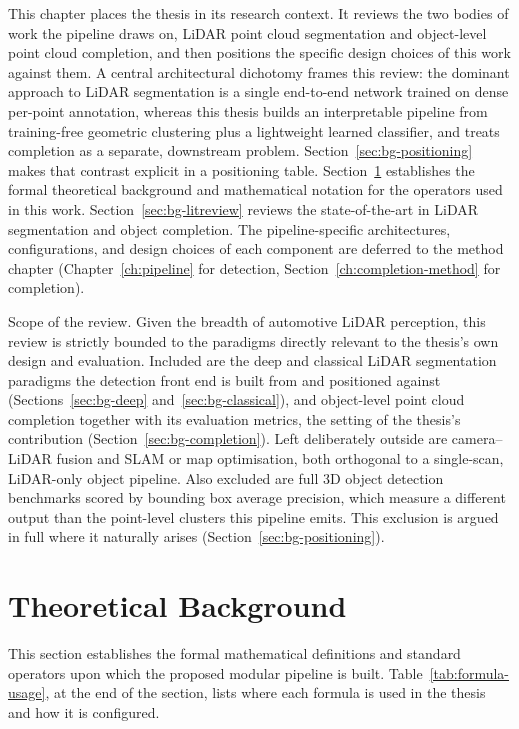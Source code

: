 This chapter places the thesis in its research context. It reviews the two bodies of
work the pipeline draws on, LiDAR point cloud segmentation and object-level
point cloud completion, and then positions the specific design choices of this
work against them. A central architectural dichotomy frames this review: the dominant approach to
LiDAR segmentation is a single end-to-end network trained on dense per-point
annotation, whereas this thesis builds an interpretable pipeline from training-free
geometric clustering plus a lightweight learned classifier, and treats completion as a
separate, downstream problem. Section~\ref{sec:bg-positioning} makes that contrast
explicit in a positioning table. Section~\ref{sec:bg-theory} establishes the formal
theoretical background and mathematical notation for the operators used in this work.
Section~\ref{sec:bg-litreview} reviews the state-of-the-art in LiDAR segmentation and
object completion. The
pipeline-specific architectures, configurations, and design choices of each component are
deferred to the method chapter (Chapter~\ref{ch:pipeline} for detection,
Section~\ref{ch:completion-method} for completion).

Scope of the review. Given the breadth of automotive LiDAR perception, this review
is strictly bounded to the paradigms directly relevant to the thesis's own
design and evaluation. Included are the deep and classical LiDAR segmentation paradigms the
detection front end is built from and positioned against (Sections~\ref{sec:bg-deep}
and~\ref{sec:bg-classical}), and object-level point cloud completion together with its
evaluation metrics, the setting of the thesis's contribution (Section~\ref{sec:bg-completion}).
Left deliberately outside are camera--LiDAR fusion and SLAM or map optimisation, both
orthogonal to a single-scan, LiDAR-only object pipeline. Also excluded are full 3D object
detection benchmarks scored by bounding box average precision, which measure a different
output than the point-level clusters this pipeline emits. This exclusion is argued in full
where it naturally arises (Section~\ref{sec:bg-positioning}).

\section{Theoretical Background}
\label{sec:bg-theory}

This section establishes the formal mathematical definitions and standard operators upon
which the proposed modular pipeline is built. Table~\ref{tab:formula-usage}, at the end of
the section, lists where each formula is used in the thesis and how it is configured.

